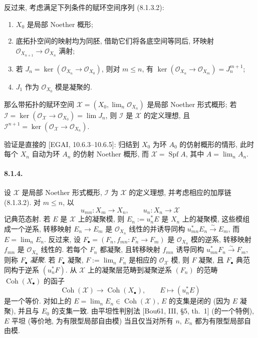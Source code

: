 反过来, 考虑满足下列条件的赋环空间序列 (8.1.3.2):
\begin{enumerate}
\item[(i)] $X_0$ 是局部 Noether 概形;
\item[(ii)] 底拓扑空间的映射均为同胚, 借助它们将各底空间等同后, 环映射 $\mathcal O_{X_{n+1}}\to\mathcal O_{X_n}$ 满射;
\item[(iii)] 若 $J_n=\ker(\mathcal O_{X_n}\to\mathcal O_{X_0})$, 则对 $m\leq n$, 有 $\ker(\mathcal O_{X_n}\to\mathcal O_{X_m})=J_n^{m+1}$;
\item[(iv)] $J_1$ 作为 $\mathcal O_{X_0}$ 模是凝聚的.
\end{enumerate}
那么带拓扑的赋环空间 $\mathcal X=(X_0,\lim_n\mathcal O_{X_n})$ 是局部 Noether 形式概形; 若 $\mathcal I=\ker(\mathcal O_{\mathcal X}\to\mathcal O_{X_0})=\lim J_n$, 则 $\mathcal I$ 是 $\mathcal X$ 的定义理想, 且 $\mathcal I^{n+1}=\ker(\mathcal O_{\mathcal X}\to\mathcal O_{X_n})$.

验证是直接的 [EGAI, 10.6.3--10.6.5]: 归结到 $X_0$ 为环 $A_0$ 的仿射概形的情形, 此时每个 $X_n$ 自动为环 $A_n$ 的仿射 Noether 概形, 而 $\mathcal X=\operatorname{Spf}A$, 其中 $A=\lim_n A_n$.

\paragraph{8.1.4.}
设 $\mathcal X$ 是局部 Noether 形式概形, $\mathcal I$ 为 $\mathcal X$ 的定义理想, 并考虑相应的加厚链 (8.1.3.2). 对 $m\leq n$, 以
\[u_{mn}:X_m\longrightarrow X_n,\qquad u_n:X_n\longrightarrow\mathcal X\]
记典范态射. 若 $E$ 是 $\mathcal X$ 上的凝聚模, 则 $E_n:=u_n^*E$ 是 $X_n$ 上的凝聚模, 这些模组成一个逆系, 转移映射 $E_n\to E_m$ 是 $\mathcal O_{X_n}$ 线性的并诱导同构 $u_{mn}^*E_n\xrightarrow\sim E_m$, 而 $E=\lim_n E_n$. 反过来, 设 $F_\bullet=(F_n,f_{mn}:F_n\to F_m)$ 是 $\mathcal O_{X_n}$ 模的逆系, 转移映射 $f_{mn}$ 是 $\mathcal O_{X_n}$ 线性的. 若每个 $F_n$ 都凝聚, 且转移映射 $f_{mn}$ 诱导同构 $u_{mn}^*F_n\xrightarrow\sim F_m$, 则称 $F_\bullet$ \emph{凝聚}. 若 $F_\bullet$ 凝聚, $F:=\lim_nF_n$ 是相应的 $\mathcal O_{\mathcal X}$ 模, 则 $F$ 凝聚, 且 $F_\bullet$ 典范同构于逆系 $(u_n^*F)$. 从 $\mathcal X$ 上的凝聚层范畴到凝聚逆系 $(F_n)$ 的范畴 $\operatorname{Coh}(X_\bullet)$ 的函子
\begin{equation}\operatorname{Coh}(\mathcal X)\longrightarrow\operatorname{Coh}(X_\bullet),\qquad E\longmapsto(u_n^*E)\tag{8.1.4.1}\label{ch08:eq8141}\end{equation}
是一个等价. 对如上的 $E=\lim_nE_n\in\operatorname{Coh}(\mathcal X)$, $E$ 的支集是闭的 (因为 $E$ 凝聚), 并且与 $E_0$ 的支集一致. 由平坦性判别法 [Bou61, III, §5, th.~1] (的一个特例), $E$ 平坦 (等价地, 为有限型局部自由模) 当且仅当对所有 $n$, $E_n$ 都为有限型局部自由模.

